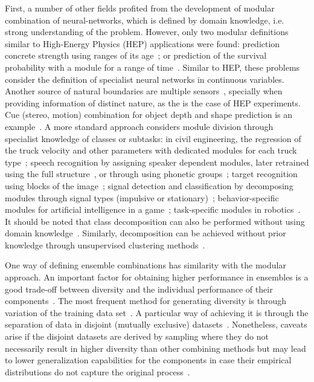 First, a number of other fields profited from the development of modular
combination of neural-networks, which is defined by domain knowledge, i.e. strong
understanding of the problem. However, only two modular definitions similar to
High-Energy Physics (HEP) applications were found: prediction concrete strength
using ranges of its age~\cite{Lee2003}; or prediction of the survival
probability with a module for a range of time~\cite{Ohno-Machado1997}. Similar
to HEP, these problems consider the definition of specialist neural networks in
continuous variables. Another source of natural boundaries are multiple
sensors~\cite{Polikar2006}, specially when providing information of
distinct nature, as the is the case of HEP experiments.
Cue (stereo, motion) combination for object depth and shape prediction is an
example~\cite{Fine1999}. A more standard approach considers module division
through specialist knowledge of classes or subtasks: in civil engineering, the
regression of the truck velocity and other parameters with dedicated modules for
each truck type~\cite{Gagarin1994}; speech recognition by assigning speaker
dependent modules, later retrained using the full structure~\cite{Nakamura1992},
or through using phonetic groups~\cite{Waibel1989a,Gee-SweePoo1995}; target
recognition using blocks of the image~\cite{Mundkur1991}; signal detection and
classification by decomposing modules through signal types (impulsive or
stationary)~\cite{DeBollivier1991}; behavior-specific modules for artificial
intelligence in a game~\cite{Schrum2014}; task-specific modules in
robotics~\cite{Alet2018}. It should be noted that class decomposition can also
be performed without using domain knowledge~\cite{Anand1995}. Similarly,
decomposition can be achieved without prior knowledge through unsupervised
clustering methods~\cite{Auda1999}.

One way of defining ensemble combinations has similarity with the \rnn{} modular
approach. An important factor for obtaining higher performance in ensembles is a
good trade-off between diversity and the individual performance of their
components~\cite{zhou_ensemble}. The most frequent method for generating
diversity is through variation of the training data
set~\cite{zhou_ensemble,SharkeyCombNN}. A particular way of achieving it is
through the separation of data in disjoint (mutually exclusive)
datasets~\cite{Sharkey1996}. Nonetheless, caveats arise if the disjoint datasets
are derived by sampling where they do not necessarily result in higher diversity
than other combining methods but may lead to lower generalization capabilities
for the components in case their empirical distributions do not capture the
original process~\cite{SharkeyCombNN}.

